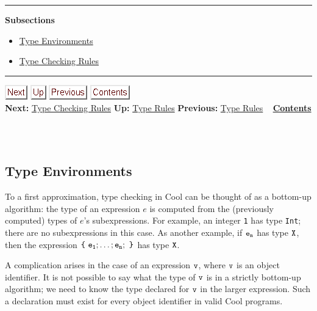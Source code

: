 \documentclass[]{article}
\begin{document}
\begin{center}\rule{3in}{0.4pt}\end{center}

\textbf{Subsections}

\begin{itemize}
\itemsep1pt\parskip0pt
\item
  \href{node42.html}{Type Environments}
\item
  \href{node43.html}{Type Checking Rules}
\end{itemize}

\begin{center}\rule{3in}{0.4pt}\end{center}

\href{node43.html}{\includegraphics{next.png}}
\href{node41.html}{\includegraphics{up.png}}
\href{node41.html}{\includegraphics{prev.png}}
\href{node1.html}{\includegraphics{contents.png}} \\ \textbf{Next:}
\href{node43.html}{Type Checking Rules} \textbf{Up:}
\href{node41.html}{Type Rules} \textbf{Previous:}
\href{node41.html}{Type Rules} ~ \textbf{\href{node1.html}{Contents}} \\
\\

\subsection{\\ Type Environments}

To a first approximation, type checking in Cool can be thought of as a
bottom-up algorithm: the type of an expression $e$ is computed from the
(previously computed) types of $e$'s subexpressions. For example, an
integer \texttt{1} has type \texttt{Int}; there are no subexpressions in
this case. As another example, if $\tt e_n$ has type $\tt X$, then the
expression $\tt\mbox {\tt\{}\ e_1; \ldots; e_n;\ \mbox {\tt\}}$ has type
$\tt X$.

A complication arises in the case of an expression $\tt v$, where
$\tt v$ is an object identifier. It is not possible to say what the type
of $\tt v$ is in a strictly bottom-up algorithm; we need to know the
type declared for $\tt v$ in the larger expression. Such a declaration
must exist for every object identifier in valid Cool programs.
\end{document}
